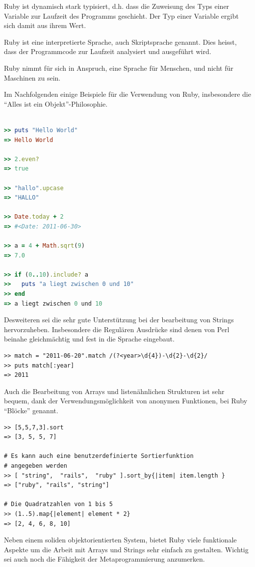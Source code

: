 Ruby ist dynamisch stark typisiert, d.h. dass die Zuweisung des Typs einer Variable zur Laufzeit des Programms geschieht. Der Typ einer Variable ergibt sich damit aus ihrem Wert.

Ruby ist eine interpretierte Sprache, auch Skriptsprache genannt. Dies heisst, dass der Programmcode zur Laufzeit analysiert und ausgeführt wird. 

Ruby nimmt für sich in Anspruch, eine Sprache für Menschen, und nicht für Maschinen zu sein.

\setlength{\epigraphwidth}{\marginparwidth}
\setlength{\epigraphwidth}{0.8\textwidth}

Im Nachfolgenden einige Beispiele für die Verwendung von Ruby, insbesondere die "`Alles ist ein Objekt"'-Philosophie.

\begin{lstlisting}[language=Ruby,label=Ruby Beispiele,caption=Ruby Beispiele]
 
>> puts "Hello World"
=> Hello World

>> 2.even?
=> true

>> "hallo".upcase
=> "HALLO"

>> Date.today + 2
=> #<Date: 2011-06-30>

>> a = 4 + Math.sqrt(9)
=> 7.0

>> if (0..10).include? a
>>   puts "a liegt zwischen 0 und 10"
>> end
=> a liegt zwischen 0 und 10

\end{lstlisting}

Desweiteren sei die sehr gute Unterstützung bei der bearbeitung von Strings hervorzuheben. Insbesondere die Regulären Ausdrücke sind denen von Perl beinahe gleichmächtig und fest in die Sprache eingebaut.

\begin{lstlisting}
>> match = "2011-06-20".match /(?<year>\d{4})-\d{2}-\d{2}/
>> puts match[:year]
=> 2011
\end{lstlisting}

Auch die Bearbeitung von Arrays und listenähnlichen Strukturen ist sehr bequem, dank der Verwendungsmöglichkeit von anonymen Funktionen, bei Ruby "`Blöcke"' genannt.

\begin{lstlisting}
>> [5,5,7,3].sort
=> [3, 5, 5, 7]

# Es kann auch eine benutzerdefinierte Sortierfunktion
# angegeben werden
>> [ "string",  "rails",  "ruby" ].sort_by{|item| item.length }
=> ["ruby", "rails", "string"]

# Die Quadratzahlen von 1 bis 5
>> (1..5).map{|element| element * 2}
=> [2, 4, 6, 8, 10]
\end{lstlisting}
Neben einem soliden objektorientierten System, bietet Ruby viele funktionale Aspekte um die Arbeit mit Arrays und Strings sehr einfach zu gestalten. Wichtig sei auch noch die Fähigkeit der Metaprogrammierung anzumerken.


